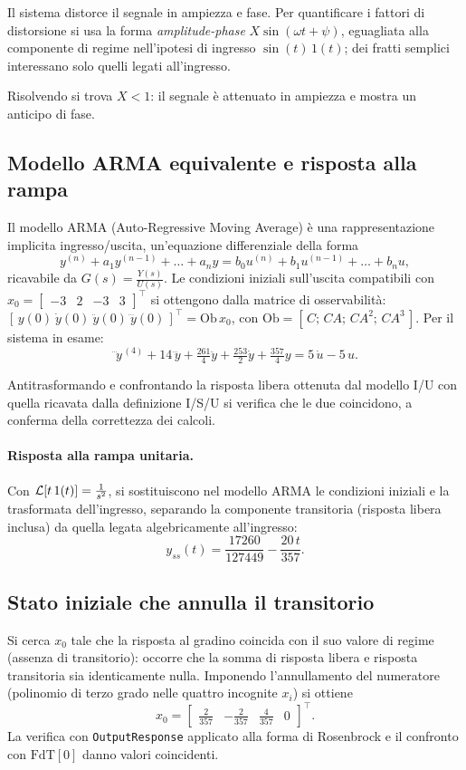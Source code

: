 Il sistema distorce il segnale in ampiezza e fase. Per quantificare i fattori di
distorsione si usa la forma \emph{amplitude-phase} $X\sin(\omega t+\psi)$, eguagliata
alla componente di regime nell'ipotesi di ingresso $\sin(t)\,1(t)$; dei fratti semplici
interessano solo quelli legati all'ingresso.


Risolvendo si trova $X<1$: il segnale è attenuato in ampiezza e mostra un anticipo di
fase.

\subsection{Modello ARMA equivalente e risposta alla rampa}
Il modello ARMA (Auto-Regressive Moving Average) è una rappresentazione implicita
ingresso/uscita, un'equazione differenziale della forma
\[
y^{(n)}+a_1y^{(n-1)}+\dots+a_ny=b_0u^{(n)}+b_1u^{(n-1)}+\dots+b_nu,
\]
ricavabile da $G(s)=\tfrac{Y(s)}{U(s)}$. Le condizioni iniziali sull'uscita compatibili
con $x_0=\begin{bmatrix}-3&2&-3&3\end{bmatrix}^{\!\top}$ si ottengono dalla matrice di
osservabilità: $[\,y(0)\ \dot y(0)\ \ddot y(0)\ \dddot y(0)\,]^{\top}=\mathrm{Ob}\,x_0$,
con $\mathrm{Ob}=[\,C;\,CA;\,CA^2;\,CA^3\,]$. Per il sistema in esame:
\[
\dddot{\!\!\;y}^{\,(4)}+14\,\dddot y+\tfrac{261}{4}\ddot y+\tfrac{253}{2}\dot y+\tfrac{357}{4}y
=5\,\dot u-5\,u.
\]


Antitrasformando e confrontando la risposta libera ottenuta dal modello I/U con quella
ricavata dalla definizione I/S/U si verifica che le due coincidono, a conferma della
correttezza dei calcoli.

\paragraph{Risposta alla rampa unitaria.}
Con $\mathcal{L}[t\,1(t)]=\tfrac{1}{s^2}$, si sostituiscono nel modello ARMA le condizioni
iniziali e la trasformata dell'ingresso, separando la componente transitoria (risposta
libera inclusa) da quella legata algebricamente all'ingresso:
\[
y_{ss}(t)=\frac{17260}{127449}-\frac{20\,t}{357}.
\]

\subsection{Stato iniziale che annulla il transitorio}
Si cerca $x_0$ tale che la risposta al gradino coincida con il suo valore di regime
(assenza di transitorio): occorre che la somma di risposta libera e risposta transitoria
sia identicamente nulla. Imponendo l'annullamento del numeratore (polinomio di terzo
grado nelle quattro incognite $x_i$) si ottiene
\[
x_0=\begin{bmatrix}\tfrac{2}{357}&-\tfrac{2}{357}&\tfrac{4}{357}&0\end{bmatrix}^{\!\top}.
\]
La verifica con \texttt{OutputResponse} applicato alla forma di Rosenbrock e il
confronto con $\mathrm{FdT}[0]$ danno valori coincidenti.

